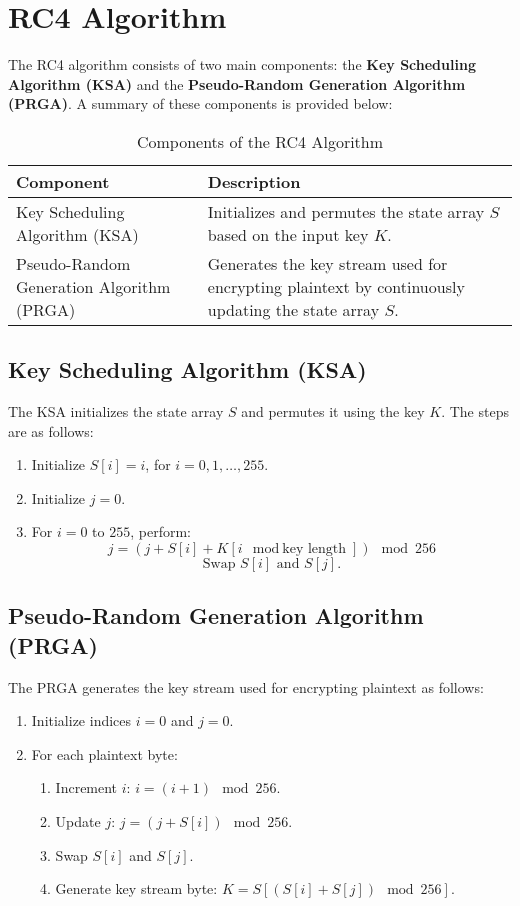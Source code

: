 \documentclass[11pt]{article}
\begin{document}
\section{RC4 Algorithm}
The RC4 algorithm consists of two main components: the \textbf{Key Scheduling Algorithm (KSA)} and the \textbf{Pseudo-Random Generation Algorithm (PRGA)}. A summary of these components is provided below:

\begin{table}[h!]
\centering
\begin{tabular}{|p{4cm}|p{8cm}|}
\hline
\textbf{Component}             & \textbf{Description} \\ \hline
Key Scheduling Algorithm (KSA) & Initializes and permutes the state array \( S \) based on the input key \( K \). \\ \hline
Pseudo-Random Generation Algorithm (PRGA) & Generates the key stream used for encrypting plaintext by continuously updating the state array \( S \). \\ \hline
\end{tabular}
\caption{Components of the RC4 Algorithm}
\end{table}

\subsection{Key Scheduling Algorithm (KSA)}
The KSA initializes the state array \( S \) and permutes it using the key \( K \). The steps are as follows:

\begin{enumerate}
    \item Initialize \( S[i] = i \), for \( i = 0, 1, \ldots, 255 \).
    \item Initialize \( j = 0 \).
    \item For \( i = 0 \) to \( 255 \), perform:
    \[
    j = (j + S[i] + K[i \mod \text{key length}]) \mod 256
    \]
    \[
    \text{Swap } S[i] \text{ and } S[j].
    \]
\end{enumerate}

\subsection{Pseudo-Random Generation Algorithm (PRGA)}
The PRGA generates the key stream used for encrypting plaintext as follows:

\begin{enumerate}
    \item Initialize indices \( i = 0 \) and \( j = 0 \).
    \item For each plaintext byte:
    \begin{enumerate}
        \item Increment \( i \): \( i = (i + 1) \mod 256 \).
        \item Update \( j \): \( j = (j + S[i]) \mod 256 \).
        \item Swap \( S[i] \) and \( S[j] \).
        \item Generate key stream byte: \( K = S[(S[i] + S[j]) \mod 256] \).
    \end{enumerate}
\end{enumerate}
\end{document}
